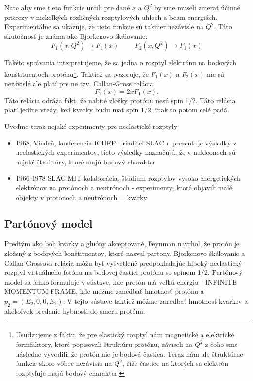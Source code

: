 \documentclass[../../main.tex]{subfiles}
\begin{document}
Nato aby sme tieto funkcie určili pre dané $x$ a $Q^2$ by sme museli zmerať účinné prierezy v niekoľkých rozličných rozptylových uhloch a beam energiách.
Experimentálne sa ukazuje, že tieto funkcie sú takmer nezávislé na $Q^2$. Táto skutočnosť je známa ako Bjorkenovo škálovanie:
$$ F_1(x,Q^2) \rightarrow F_1(x) \hspace{1cm} F_2(x,Q^2) \rightarrow F_1(x) $$

Takéto správania interpretujeme, že sa jedna o rozptyl elektrónu na bodových konštituentoch protónu\footnote{Usudzujeme z faktu, že pre elastický rozptyl nám magnetické a elektrické formfaktory, ktoré popisovali štruktúru protónu, záviseli na $Q^2$ z čoho sme následne vyvodili, že protón nie je bodová častica. Teraz nám ale štruktúrne funkcie skoro vôbec nezávisia na $Q^2$, čiže častice na ktorých sa elektrón rozptyľuje majú bodový charakter.}. Taktiež sa pozoruje, že $F_1(x)$ a $F_2(x)$ nie sú nezávislé ale platí pre ne tzv. Callan-Gross relácia:
$$ F_2(x) = 2xF_1(x).$$
Táto relácia odráža fakt, že nabité zložky protónu nesú spin 1/2. Táto relácia platí jedine vtedy, keď kvarky budu mať spin 1/2, inak to potom celé padá.

Uveďme teraz nejaké experimenty pre neelastické rozptyly
\begin{itemize}
\item 1968, Viedeň, konferencia ICHEP - riaditeľ SLAC-u prezentuje výsledky z neelastických experimentov, tieto výsledky naznačujú, že v nukleonoch sú nejaké štruktúry, ktoré majú bodový charakter
\item 1966-1978 SLAC-MIT kolaborácia, štúdium rozptylov vysoko-energetických elektrónov na protónoch a neutrónoch - experimenty, ktoré objavili malé objekty v protónoch a neutrónoch = kvarky
\end{itemize}

\subsection{Partónový model}
Predtým ako boli kvarky a gluóny akceptované, Feynman navrhol, že protón je zložený z bodových konštituentov, ktoré nazval partony. Bjorkenovo škálovanie a Callan-Grossová relácia môžu byť vysvetlené predpokladajúc hlboký neelastický rozptyl virtuálneho fotónu na bodovej častici protónu so spinom 1/2. Partónový model sa ľahko formuluje v sústave, kde protón má veľkú energiu - INFINITE MOMENTUM FRAME, kde môžme zanedbať hmotnosť protónu a $p_2=(E_2,0,0,E_2)$. V tejto sústave taktiež môžme zanedbať hmotnosť kvarkov a akékoľvek predanie hybnosti do smeru protónu.
\end{document}
